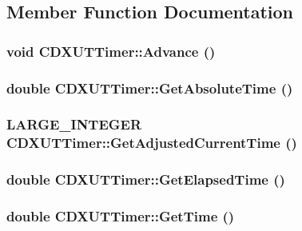 \subsection{Member Function Documentation}
\hypertarget{class_c_d_x_u_t_timer_a1a40a2b93164867f6d895b755a6e2938}{
\subsubsection[{Advance}]{\setlength{\rightskip}{0pt plus 5cm}void CDXUTTimer::Advance ()}}
\label{class_c_d_x_u_t_timer_a1a40a2b93164867f6d895b755a6e2938}
\hypertarget{class_c_d_x_u_t_timer_a0a742c4999a06c61c8558f58ef9211ce}{
\subsubsection[{GetAbsoluteTime}]{\setlength{\rightskip}{0pt plus 5cm}double CDXUTTimer::GetAbsoluteTime ()}}
\label{class_c_d_x_u_t_timer_a0a742c4999a06c61c8558f58ef9211ce}
\hypertarget{class_c_d_x_u_t_timer_ae3e30ee1953d922c42dae96088b5842f}{
\subsubsection[{GetAdjustedCurrentTime}]{\setlength{\rightskip}{0pt plus 5cm}LARGE\_\-INTEGER CDXUTTimer::GetAdjustedCurrentTime ()}}
\label{class_c_d_x_u_t_timer_ae3e30ee1953d922c42dae96088b5842f}
\hypertarget{class_c_d_x_u_t_timer_a425d2ad814bcea3a2cef5518a98168f8}{
\subsubsection[{GetElapsedTime}]{\setlength{\rightskip}{0pt plus 5cm}double CDXUTTimer::GetElapsedTime ()}}
\label{class_c_d_x_u_t_timer_a425d2ad814bcea3a2cef5518a98168f8}
\hypertarget{class_c_d_x_u_t_timer_a48c372d2d7ba669872d4a77d46aec33b}{
\subsubsection[{GetTime}]{\setlength{\rightskip}{0pt plus 5cm}double CDXUTTimer::GetTime ()}}

